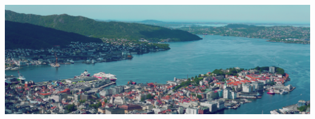 \documentclass[10pt,a4paper]{article}
\begin{document}
\mbox{}

\vspace{-1cm}\hspace{-1.5cm}\includegraphics[width=1.1\textwidth,height=7cm]{images/bergen.jpg}
\end{document}
